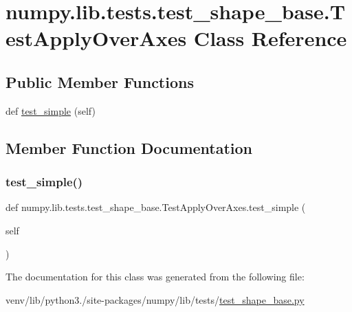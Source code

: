 \hypertarget{classnumpy_1_1lib_1_1tests_1_1test__shape__base_1_1TestApplyOverAxes}{}\section{numpy.\+lib.\+tests.\+test\+\_\+shape\+\_\+base.\+Test\+Apply\+Over\+Axes Class Reference}
\label{classnumpy_1_1lib_1_1tests_1_1test__shape__base_1_1TestApplyOverAxes}
\subsection*{Public Member Functions}
\begin{DoxyCompactItemize}
\item 
def \hyperlink{classnumpy_1_1lib_1_1tests_1_1test__shape__base_1_1TestApplyOverAxes_aa071e205b6be5298e39d06bff2f7a722}{test\+\_\+simple} (self)
\end{DoxyCompactItemize}


\subsection{Member Function Documentation}
\mbox{\label{classnumpy_1_1lib_1_1tests_1_1test__shape__base_1_1TestApplyOverAxes_aa071e205b6be5298e39d06bff2f7a722}} 
\subsubsection{\texorpdfstring{test\+\_\+simple()}{test\_simple()}}
{\footnotesize\ttfamily def numpy.\+lib.\+tests.\+test\+\_\+shape\+\_\+base.\+Test\+Apply\+Over\+Axes.\+test\+\_\+simple (\begin{DoxyParamCaption}\item[{}]{self }\end{DoxyParamCaption})}



The documentation for this class was generated from the following file\+:\begin{DoxyCompactItemize}
\item 
venv/lib/python3./site-\/packages/numpy/lib/tests/\hyperlink{lib_2tests_2test__shape__base_8py}{test\+\_\+shape\+\_\+base.\+py}\end{DoxyCompactItemize}
